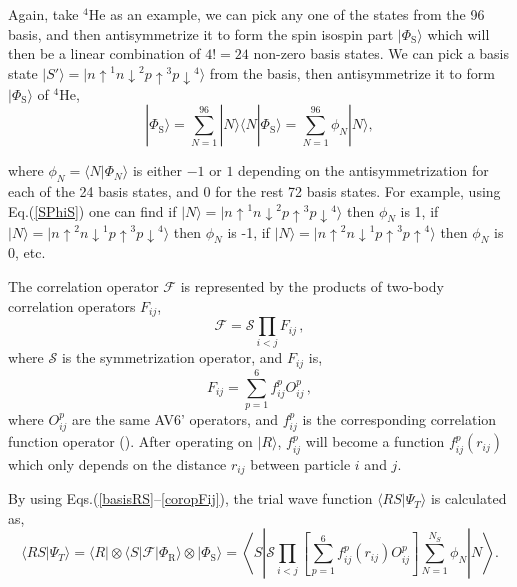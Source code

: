 \documentclass[12pt,letterpaper,UTF8]{report}
\begin{document}
Again, take $^4$He as an example, we can pick any one of the states from the 96 basis, and then antisymmetrize it to form the spin isospin part $| \Phi_\textrm{S} \rangle$ which will then be a linear combination of $4!=24$ non-zero basis states. We can pick a basis state $ |S' \rangle= | {n \uparrow}^1 {n \downarrow}^2 {p \uparrow}^3 {p \downarrow}^4  \rangle$ from the basis, then antisymmetrize it to form $| \Phi_\textrm{S} \rangle$ of $^4$He,
\begin{equation}
|\Phi_\textrm{S} \rangle
= \sum_{N=1}^{96}  | N \rangle \langle N | \Phi_\textrm{S} \rangle
= \sum_{N=1}^{96} \phi_N | N \rangle  , \label{PhiSHe4}
\end{equation}

where $\phi_N=\langle N | \Phi_N\rangle$ is either $-1$ or $1$ depending on the antisymmetrization for each of the 24  basis states, and 0 for the rest 72 basis states. For example, using Eq.(\ref{SPhiS}) one can find  if $ | N\rangle =| {n \uparrow}^1 {n \downarrow}^2 {p \uparrow}^3 {p \downarrow}^4  \rangle$ then $\phi_N$ is 1, if $ | N \rangle =| {n \uparrow}^2 {n \downarrow}^1 {p \uparrow}^3 {p \downarrow}^4  \rangle$ then  $\phi_N$ is -1, if $ | N\rangle =| {n \uparrow}^2 {n \downarrow}^1 {p \uparrow}^3 {p \uparrow}^4  \rangle$ then  $\phi_N$ is 0, etc.

The correlation operator $\mathcal{F}$ is represented by the products of two-body correlation operators $F_{ij}$,
\begin{equation}
{\mathcal F} =  {\mathcal S} \prod_{i<j} F_{ij} \, , \label{coropF}
\end{equation}
where $\mathcal{S}$ is the symmetrization operator, and $F_{ij}$ is,
\begin{equation}
F_{ij} =  \sum_{p=1}^6 f_{ij}^p O_{ij}^p \, , \label{coropFij}
\end{equation}
where $O_{ij}^p$ are the same AV6' operators, and $f_{ij}^p $ is the corresponding correlation function operator (\cite{Lomnitz1981NPA}). After operating on $| R \rangle$, $f_{ij}^p $ will become a function $f_{ij}^p (r_{ij}) $ which only depends on the distance $r_{ij}$ between particle $i$ and $j$.

By using Eqs.(\ref{basisRS}--\ref{coropFij}), the trial wave function $ \langle R S | \Psi_T  \rangle $ is calculated as,
\begin{equation}
\langle R S | \Psi_T  \rangle \! = \!
\langle R  | \otimes  \langle S | \mathcal{F} |\Phi_{\textrm{R}} \rangle \otimes | \Phi_{\textrm{S}} \rangle
\!=\!
\left\langle S \left|
{\mathcal S}  \prod_{i<j}
\left[
\sum_{p=1}^6   f_{ij}^p (r_{ij})  O_{ij}^p
\right]
\sum_{N=1}^{N_S} \phi_N \right| N \right\rangle
 . \label{RSPsiT}
\end{equation}
\end{document}
